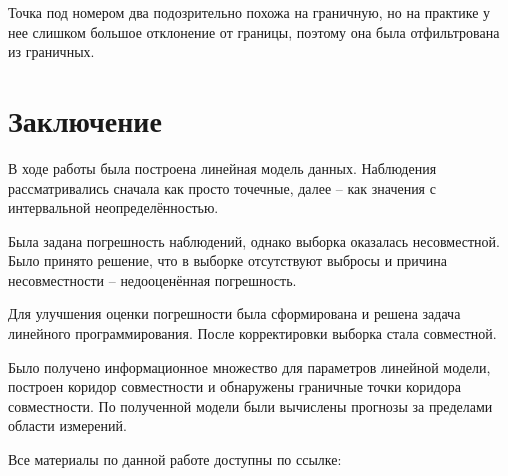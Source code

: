 \documentclass[a4paper,12pt]{article}
\begin{document}
Точка под номером два подозрительно похожа на граничную, но на практике у 
нее слишком большое отклонение от границы, поэтому она была отфильтрована из
граничных.

\newpage
\section{Заключение}

В ходе работы была построена линейная модель данных. Наблюдения
рассматривались сначала как просто точечные, далее – как значения с 
интервальной неопределённостью.

Была задана погрешность наблюдений, однако выборка оказалась несовместной.
Было принято решение, что в выборке отсутствуют выбросы и причина
несовместности – недооценённая погрешность.

Для улучшения оценки погрешности была сформирована и решена задача линейного
программирования. После корректировки выборка стала совместной.

Было получено информационное множество для параметров линейной модели,
построен коридор совместности и обнаружены граничные точки коридора
совместности.
По полученной модели были вычислены прогнозы за пределами области измерений.

Все материалы по данной работе доступны по ссылке:~\cite{github}

\newpage

\listoffigures
\listoftables


\end{document}
